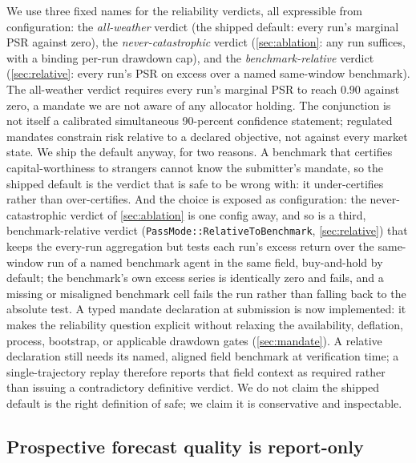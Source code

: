 We use three fixed names for the reliability verdicts, all expressible from configuration: the \emph{all-weather} verdict (the shipped default: every run's marginal PSR against zero), the \emph{never-catastrophic} verdict (\cref{sec:ablation}: any run suffices, with a binding per-run drawdown cap), and the \emph{benchmark-relative} verdict (\cref{sec:relative}: every run's PSR on excess over a named same-window benchmark). The all-weather verdict requires every run's marginal PSR to reach $0.90$ against zero, a mandate we are not aware of any allocator holding. The conjunction is not itself a calibrated simultaneous 90-percent confidence statement; regulated mandates constrain risk relative to a declared objective, not against every market state. We ship the default anyway, for two reasons. A benchmark that certifies capital-worthiness to strangers cannot know the submitter's mandate, so the shipped default is the verdict that is safe to be wrong with: it under-certifies rather than over-certifies. And the choice is exposed as configuration: the never-catastrophic verdict of \cref{sec:ablation} is one config away, and so is a third, benchmark-relative verdict (\texttt{PassMode::RelativeToBenchmark}, \cref{sec:relative}) that keeps the every-run aggregation but tests each run's excess return over the same-window run of a named benchmark agent in the same field, buy-and-hold by default; the benchmark's own excess series is identically zero and fails, and a missing or misaligned benchmark cell fails the run rather than falling back to the absolute test. A typed mandate declaration at submission is now implemented: it makes the reliability question explicit without relaxing the availability, deflation, process, bootstrap, or applicable drawdown gates (\cref{sec:mandate}). A relative declaration still needs its named, aligned field benchmark at verification time; a single-trajectory replay therefore reports that field context as required rather than issuing a contradictory definitive verdict. We do not claim the shipped default is the right definition of safe; we claim it is conservative and inspectable.

\subsection{Prospective forecast quality is report-only}\label{sec:forecast-quality}

